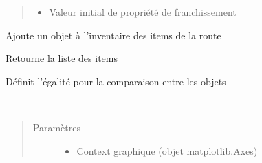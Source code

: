 \documentclass[a4paper,10pt,french]{sphinxmanual}
\begin{document}
\begin{fulllineitems}
\begin{quote}
\begin{description}
\begin{itemize}
\item {} 
 \textendash{} Valeur initial de propriété de franchissement

\end{itemize}

\end{description}\end{quote}

\begin{fulllineitems}
\label{\detokenize{road_objects/road_item:road_objects.road_item.RoadItem.Add_item}}
Ajoute un objet à l’inventaire des items de la route

\end{fulllineitems}


\begin{fulllineitems}
\label{\detokenize{road_objects/road_item:road_objects.road_item.RoadItem.Get_Items}}
Retourne la liste des items

\end{fulllineitems}


\begin{fulllineitems}
\label{\detokenize{road_objects/road_item:road_objects.road_item.RoadItem.__eq__}}
Définit l’égalité pour la comparaison entre les objets

\end{fulllineitems}


\begin{fulllineitems}
\label{\detokenize{road_objects/road_item:road_objects.road_item.RoadItem.__init__}}~\begin{quote}\begin{description}
\item[{Paramètres}] \leavevmode\begin{itemize}
\item {} 
 \textendash{} Context graphique (objet matplotlib.Axes)


\end{itemize}
\end{description}
\end{quote}
\end{fulllineitems}
\end{fulllineitems}
\end{document}

